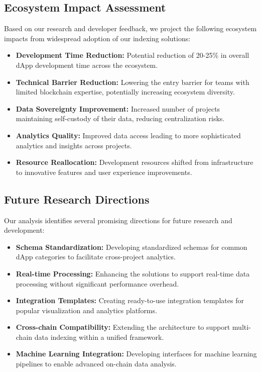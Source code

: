 \subsection{Ecosystem Impact Assessment}

Based on our research and developer feedback, we project the following ecosystem impacts from widespread adoption of our indexing solutions:

\begin{itemize}
    \item \textbf{Development Time Reduction:} Potential reduction of 20-25\% in overall dApp development time across the ecosystem.
    
    \item \textbf{Technical Barrier Reduction:} Lowering the entry barrier for teams with limited blockchain expertise, potentially increasing ecosystem diversity.
    
    \item \textbf{Data Sovereignty Improvement:} Increased number of projects maintaining self-custody of their data, reducing centralization risks.
    
    \item \textbf{Analytics Quality:} Improved data access leading to more sophisticated analytics and insights across projects.
    
    \item \textbf{Resource Reallocation:} Development resources shifted from infrastructure to innovative features and user experience improvements.
\end{itemize}

\subsection{Future Research Directions}

Our analysis identifies several promising directions for future research and development:

\begin{itemize}
    \item \textbf{Schema Standardization:} Developing standardized schemas for common dApp categories to facilitate cross-project analytics.
    
    \item \textbf{Real-time Processing:} Enhancing the solutions to support real-time data processing without significant performance overhead.
    
    \item \textbf{Integration Templates:} Creating ready-to-use integration templates for popular visualization and analytics platforms.
    
    \item \textbf{Cross-chain Compatibility:} Extending the architecture to support multi-chain data indexing within a unified framework.
    
    \item \textbf{Machine Learning Integration:} Developing interfaces for machine learning pipelines to enable advanced on-chain data analysis.
\end{itemize} 